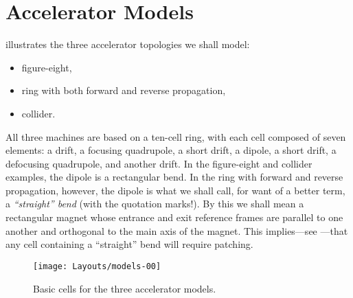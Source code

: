 \section{Accelerator Models}
\label{sec:accel.models}

%
 illustrates the three accelerator topologies
we shall model:
\begin{itemize}
  \item figure-eight,
  \item ring with both forward and reverse propagation,
  \item collider.
\end{itemize}
All three machines are based on a ten-cell ring, with each cell
composed of seven elements: a drift, a focusing quadrupole, a short
drift, a dipole, a short drift, a defocusing quadrupole, and another
drift.%
In the figure-eight and collider examples, the dipole is a rectangular
bend. In the ring with forward and reverse propagation, however, the
dipole is what we shall call, for want of a better term, a
\emph{``straight'' bend} (with the quotation marks!). By this we shall
mean a rectangular  magnet whose entrance and exit reference
frames are parallel to one another and orthogonal to the main axis of
the magnet. 
This implies---see ---that any cell
containing a ``straight'' bend will require patching. 

\begin{figure}[htb]\forceversofloat
  \centering
  \texttt{[image: Layouts/models-00]}
  \caption{Basic cells for the three accelerator models.}
  \label{fig:basic.cells}
\end{figure}

